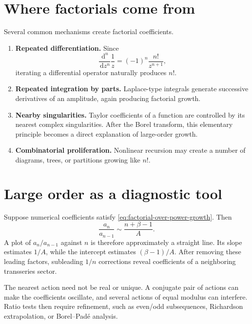 \documentclass[11pt,oneside]{book}
\theoremstyle{definition}
\theoremstyle{remark}
\newcommand{\dd}{\,\mathrm{d}}
\begin{document}
\section{Where factorials come from}

Several common mechanisms create factorial coefficients.

\begin{enumerate}
\item \textbf{Repeated differentiation.} Since
\[
  \frac{\dd^n}{\dd z^n}\frac1z=(-1)^n\frac{n!}{z^{n+1}},
\]
iterating a differential operator naturally produces $n!$.

\item \textbf{Repeated integration by parts.} Laplace-type integrals generate
successive derivatives of an amplitude, again producing factorial growth.

\item \textbf{Nearby singularities.} Taylor coefficients of a function are
controlled by its nearest complex singularities. After the Borel transform,
this elementary principle becomes a direct explanation of large-order growth.

\item \textbf{Combinatorial proliferation.} Nonlinear recursion may create a
number of diagrams, trees, or partitions growing like $n!$.
\end{enumerate}

\section{Large order as a diagnostic tool}

Suppose numerical coefficients satisfy \eqref{eq:factorial-over-power-growth}.
Then
\begin{equation}
  \frac{a_n}{a_{n-1}}
  \sim \frac{n+\beta-1}{A}.
  \label{eq:ratio-large-order}
\end{equation}
A plot of $a_n/a_{n-1}$ against $n$ is therefore approximately a straight line.
Its slope estimates $1/A$, while the intercept estimates $(\beta-1)/A$.
After removing these leading factors, subleading $1/n$ corrections reveal
coefficients of a neighboring transseries sector.

\begin{warningbox}
The nearest action need not be real or unique. A conjugate pair of actions can
make the coefficients oscillate, and several actions of equal modulus can
interfere. Ratio tests then require refinement, such as even/odd subsequences,
Richardson extrapolation, or Borel--Pad\'e analysis.
\end{warningbox}
\end{document}
